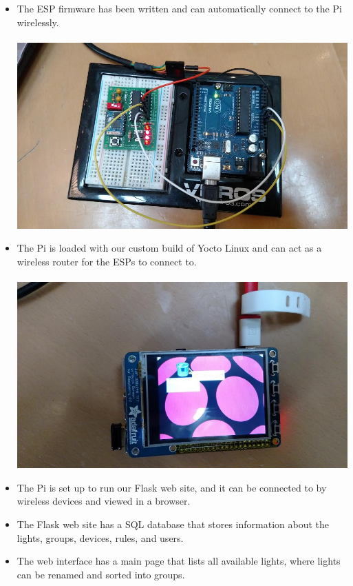 \documentclass[10pt,draftclsnofoot,onecolumn]{IEEEtran}
\begin{document}
\begin{itemize}
    \item The ESP firmware has been written and can automatically connect to
        the Pi wirelessly. \\ \\
      \includegraphics[width=1.0\textwidth]{pi-esp.png}
    \item The Pi is loaded with our custom build of Yocto Linux and can act as
        a wireless router for the ESPs to connect to. \\ \\
      \includegraphics[width=1.0\textwidth]{pi-screen.png}
    \item The Pi is set up to run our Flask web site, and it can be connected 
        to by wireless devices and viewed in a browser.
    \item The Flask web site has a SQL database that stores information about
        the lights, groups, devices, rules, and users.
    \item The web interface has a main page that lists all available lights,
        where lights can be renamed and sorted into groups. \\ \\

\end{itemize}
\end{document}
